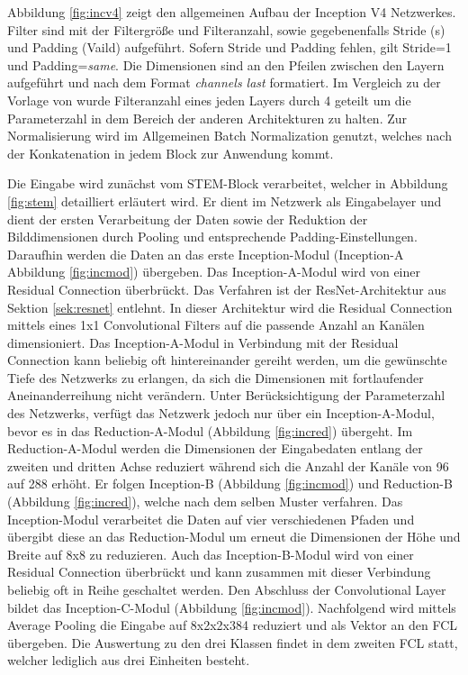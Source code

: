 Abbildung \ref{fig:incv4} zeigt den allgemeinen Aufbau der Inception V4 Netzwerkes. Filter sind mit der Filtergröße und Filteranzahl, sowie gegebenenfalls Stride (s) und Padding (Vaild) aufgeführt. Sofern Stride und Padding fehlen, gilt Stride=1 und Padding=\textit{same}. Die Dimensionen sind an den Pfeilen zwischen den Layern aufgeführt und nach dem Format \textit{channels last} formatiert. Im Vergleich zu der Vorlage von \textcite{DBLP:journals/corr/SzegedyIV16} wurde Filteranzahl eines jeden Layers durch 4 geteilt um die Parameterzahl in dem Bereich der anderen Architekturen zu halten. Zur Normalisierung wird im Allgemeinen Batch Normalization genutzt, welches nach der Konkatenation in jedem Block zur Anwendung kommt. 

Die Eingabe wird zunächst vom STEM-Block verarbeitet, welcher in Abbildung \ref{fig:stem} detailliert erläutert wird. Er dient im Netzwerk als Eingabelayer und dient der ersten Verarbeitung der Daten sowie der Reduktion der Bilddimensionen durch Pooling und entsprechende Padding-Einstellungen. Daraufhin werden die Daten an das erste Inception-Modul (Inception-A Abbildung \ref{fig:incmod}) übergeben. Das Inception-A-Modul wird von einer Residual Connection überbrückt. Das Verfahren ist der ResNet-Architektur aus Sektion \ref{sek:resnet} entlehnt. In dieser Architektur wird die Residual Connection mittels eines 1x1 Convolutional Filters auf die passende Anzahl an Kanälen dimensioniert. Das Inception-A-Modul in Verbindung mit der Residual Connection kann beliebig oft hintereinander gereiht werden, um die gewünschte Tiefe des Netzwerks zu erlangen, da sich die Dimensionen mit fortlaufender Aneinanderreihung nicht verändern. Unter Berücksichtigung der Parameterzahl des Netzwerks, verfügt das Netzwerk jedoch nur über ein Inception-A-Modul, bevor es in das Reduction-A-Modul (Abbildung \ref{fig:incred}) übergeht. Im Reduction-A-Modul werden die Dimensionen der Eingabedaten entlang der zweiten und dritten Achse reduziert während sich die Anzahl der Kanäle von 96 auf 288 erhöht. Er folgen Inception-B (Abbildung \ref{fig:incmod}) und Reduction-B (Abbildung \ref{fig:incred}), welche nach dem selben Muster verfahren. Das Inception-Modul verarbeitet die Daten auf vier verschiedenen Pfaden und übergibt diese an das Reduction-Modul um erneut die Dimensionen der Höhe und Breite auf 8x8 zu reduzieren. Auch das Inception-B-Modul wird von einer Residual Connection überbrückt und kann zusammen mit dieser Verbindung beliebig oft in Reihe geschaltet werden. Den Abschluss der Convolutional Layer bildet das Inception-C-Modul (Abbildung \ref{fig:incmod}). Nachfolgend wird mittels Average Pooling die Eingabe auf 8x2x2x384 reduziert und als Vektor an den FCL übergeben. Die Auswertung zu den drei Klassen findet in dem zweiten FCL statt, welcher lediglich aus drei Einheiten besteht. 
